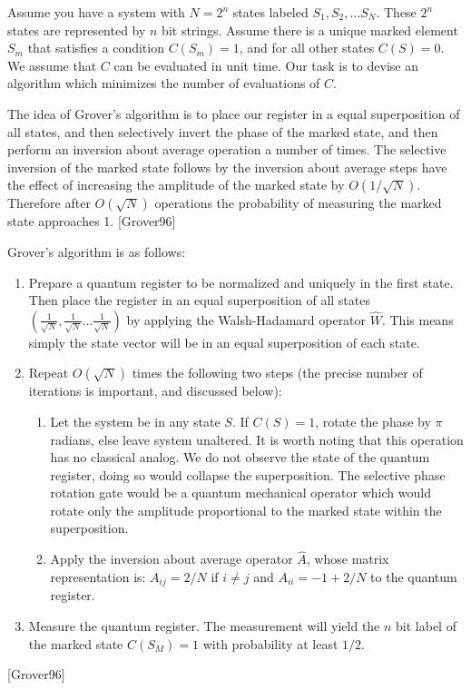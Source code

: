\documentclass[]{article}
\begin{document}
Assume you have a system with $N = 2^{n}$ states labeled $S_{1},S_{2},
\ldots S_{N}$.  These $2^{n}$ states are represented by $n$ bit
strings.  Assume there is a unique marked element $S_{m}$ that
satisfies a condition $C(S_{m}) = 1$, and for all other states $C(S) =
0$.  We assume that $C$ can be evaluated in unit time.  Our task is to
devise an algorithm which minimizes the number of evaluations of $C$.

The idea of Grover's algorithm is to place our register in a equal
superposition of all states, and then selectively invert the phase of
the marked state, and then perform an inversion about average
operation a number of times.  The selective inversion of the marked
state follows by the inversion about average steps have the effect of
increasing the amplitude of the marked state by $O(1/\sqrt{N})$.
Therefore after $O(\sqrt{N})$ operations the probability of measuring
the marked state approaches 1. [Grover96]

	Grover's algorithm is as follows: 
\begin{enumerate}
\item 
Prepare a quantum register to be normalized and uniquely in the first
state.  Then place the register in an equal superposition of all
states $\left(\frac{1}{\sqrt{N}},
\frac{1}{\sqrt{N}} \ldots \frac{1}{\sqrt{N}}\right)$ by applying the Walsh-Hadamard operator $\hat{W}$.  This means simply the state vector will be in an equal superposition of each state.

\item
Repeat $O(\sqrt{N})$ times the following two steps (the precise number
of iterations is important, and discussed below):

\begin{enumerate}
\item
Let the system be in any state $S$.  If $C(S) = 1$, rotate the phase
by $\pi$ radians, else leave system unaltered.  It is worth noting
that this operation has no classical analog.  We do not observe the
state of the quantum register, doing so would collapse the
superposition.  The selective phase rotation gate would be a quantum
mechanical operator which would rotate only the amplitude proportional
to the marked state within the superposition.

\item 
Apply the inversion about average operator $\hat{A}$, whose matrix
representation is: $A_{ij} = 2/N$ if $i \not = j$ and $A_{ii} = -1 + 2/N$ to the quantum register.
\end{enumerate}

\item
Measure the quantum register.  The measurement will yield the $n$ bit
label of the marked state $C(S_{M}) = 1$ with probability at least
$1/2$.

\end{enumerate}
[Grover96]
\end{document}
